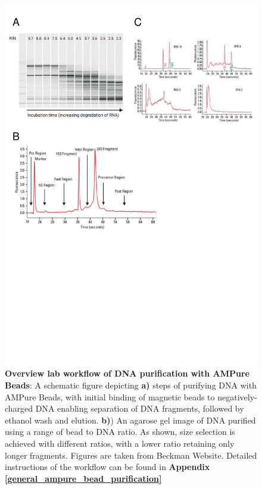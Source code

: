 \begin{figure}[!h]
	\centering
	\vspace{20pt}
	\includegraphics[page=3,trim={0 8cm 0 0 },clip, scale = 0.7]{Figures/General_Methodology_Figures.pdf}
	\captionsetup{width=0.95\textwidth}
	\caption[Overview lab workflow of DNA purification with AMPure Beads]%
	{\textbf{Overview lab workflow of DNA purification with AMPure Beads}: A schematic figure depicting \textbf{a)} steps of purifying DNA with AMPure Beads, with initial binding of magnetic beads to negatively-charged DNA enabling separation of DNA fragments, followed by ethanol wash and elution. \textbf{b)}) An agarose gel image of DNA purified using a range of bead to DNA ratio. As shown, size selection is achieved with different ratios, with a lower ratio retaining only longer fragments. Figures are taken from Beckman Website. Detailed instructions of the workflow can be found in \textbf{Appendix \ref{general_ampure_bead_purification}}}
	\label{fig:ampure_bead_workflow}
\end{figure}

